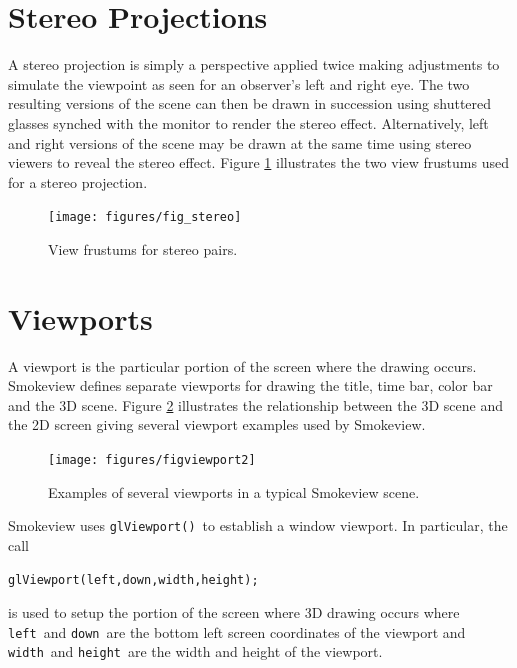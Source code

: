 \documentclass[11pt,twoside]{book}
\begin{document}
\section{Stereo Projections}

A stereo projection is simply a perspective applied twice making adjustments to simulate the viewpoint as seen for an observer's left and right eye.  The two resulting versions of the
scene can then be drawn in succession using shuttered glasses synched with the monitor to render the stereo effect.  Alternatively, left and right versions of the scene may be drawn at the same time using stereo viewers to reveal the stereo effect.  Figure \ref{figstereo} illustrates the two view frustums used for a stereo projection.

\begin{figure}[t]
\begin{center}
\texttt{[image: figures/fig\_stereo]}
\end{center}
\caption{View frustums for stereo pairs.}
 \label{figstereo}
\end{figure}

\section{Viewports}
A viewport is the particular portion of the screen where the drawing
occurs.  Smokeview defines separate viewports for drawing the
title, time bar, color bar and the 3D scene.  Figure
\ref{figviewports} illustrates the relationship between the 3D
scene and the 2D screen giving several viewport examples used by
Smokeview.
\begin{figure}[t]
\begin{center}
\texttt{[image: figures/figviewport2]}
\end{center}
\caption{Examples of several viewports in a typical Smokeview scene.}
 \label{figviewports}
\end{figure}

Smokeview uses {\tt glViewport()}\ to establish a window viewport.  In particular, the call
\begin{verbatim}
glViewport(left,down,width,height);
\end{verbatim}
is used to setup the portion of the screen where 3D drawing occurs where {\tt left}\
and {\tt down}\ are the bottom left screen coordinates of the viewport and {\tt width}\
and {\tt height}\ are the width and height of the viewport.

%
%
\end{document}
